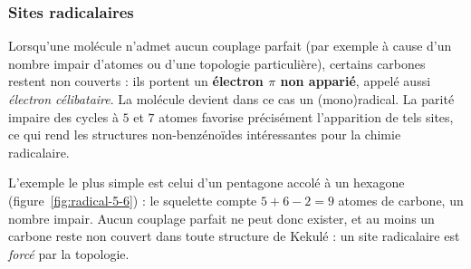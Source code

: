 \documentclass[11pt,a4paper]{article}
\begin{document}
\subsubsection{Sites radicalaires}
\label{sec:radicals}

Lorsqu'une molécule n'admet aucun couplage parfait (par exemple à cause d'un
nombre impair d'atomes ou d'une topologie particulière), certains carbones
restent non couverts : ils portent un \textbf{électron $\pi$ non apparié},
appelé aussi \emph{électron célibataire}. La molécule devient dans ce cas
un (mono)radical. La parité impaire des cycles à $5$ et $7$ atomes favorise
précisément l'apparition de tels sites, ce qui rend les structures
non-benzénoïdes intéressantes pour la chimie radicalaire.

L'exemple le plus simple est celui d'un pentagone accolé à un hexagone
(figure~\ref{fig:radical-5-6}) : le squelette compte $5 + 6 - 2 = 9$ atomes
de carbone, un nombre impair. Aucun couplage parfait ne peut donc exister, et
au moins un carbone reste non couvert dans toute structure de Kekulé : un
site radicalaire est \emph{forcé} par la topologie.
\end{document}
